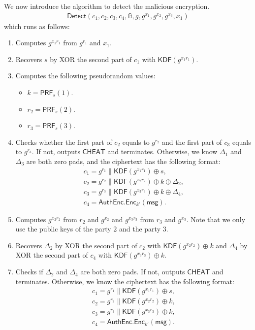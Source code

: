 \documentclass{article}
\begin{document}
We now introduce the algorithm to detect the malicious encryption.  
\[
\begin{array}{l}
\mathsf{Detect}(c_1,c_2,c_3,c_4,\mathbb{G},g,g^{x_1},g^{x_2},g^{x_3},x_1)
\end{array}
\]
which runs as follows:
\begin{enumerate}
    \item Computes $g^{x_1r_1}$ from $g^{r_1}$ and $x_1$.
    
    \item Recovers $s$ by XOR the second part of $c_1$ with $\mathsf{KDF}(g^{x_1r_1})$.
    
    \item Computes the following pseudorandom values:
    \begin{itemize}
        \item $k=\mathsf{PRF}_s(1)$.
        \item $r_2=\mathsf{PRF}_s(2)$.
        \item $r_3=\mathsf{PRF}_s(3)$.
    \end{itemize}
    
    \item Checks whether the first part of $c_2$ equals to $g^{r_2}$ and the first part of $c_3$ equals to $g^{r_3}$. If not, outputs $\mathsf{CHEAT}$ and terminates. Otherwise, we know $\Delta_1$ and $\Delta_3$ are both zero pads, and the ciphertext has the following format:
    \[
    \begin{array}{l}
    c_1=g^{r_1}\parallel\mathsf{KDF}(g^{x_1r_1})\oplus s,\\
    c_2=\boxed{g^{r_2}}\parallel\mathsf{KDF}(g^{x_2r_2})\oplus k \oplus\Delta_2,\\
    c_3=\boxed{g^{r_3}}\parallel\mathsf{KDF}(g^{x_3r_3})\oplus k \oplus\Delta_4,\\
    c_4=\mathsf{AuthEnc}.\mathsf{Enc}_{k'}(\mathsf{msg}).
    \end{array}
    \]
    
    \item Computes $g^{x_2r_2}$ from $r_2$ and $g^{x_2}$ and $g^{x_3r_3}$ from $r_3$ and $g^{x_3}$. Note that we only use the public keys of the party 2 and the party 3.
    
    \item Recovers $\Delta_2$ by XOR the second part of $c_2$ with $\mathsf{KDF}(g^{x_2r_2})\oplus k$ and $\Delta_4$ by XOR the second part of $c_4$ with $\mathsf{KDF}(g^{x_3r_3})\oplus k$. 
    
    \item Checks if $\Delta_2$ and $\Delta_4$ are both zero pads. If not, outputs $\mathsf{CHEAT}$ and terminates. Otherwise, we know the ciphertext has the following format:
    \[
    \begin{array}{l}
    c_1=g^{r_1}\parallel\mathsf{KDF}(g^{x_1r_1})\oplus s,\\
    c_2=g^{r_2}\parallel\boxed{\mathsf{KDF}(g^{x_2r_2})\oplus k,}\\
    c_3=g^{r_3}\parallel\boxed{\mathsf{KDF}(g^{x_3r_3})\oplus k,}\\
    c_4=\mathsf{AuthEnc}.\mathsf{Enc}_{k'}(\mathsf{msg}).
    \end{array}
    \]
    

\end{enumerate}
\end{document}
